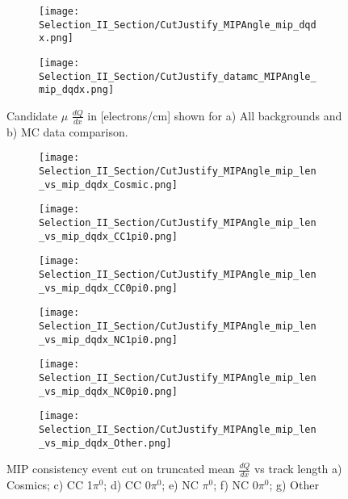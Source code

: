 \begin{figure}[H]
  \begin{subfigure}[t]{0.35\textwidth}
\texttt{[image: Selection\_II\_Section/CutJustify\_MIPAngle\_mip\_dqdx.png]}
    \caption{ }
  \end{subfigure} 
  \hspace{20mm}
  \begin{subfigure}[t]{0.35\textwidth}
\texttt{[image: Selection\_II\_Section/CutJustify\_datamc\_MIPAngle\_mip\_dqdx.png]}
    \caption{ }
  \end{subfigure} 
\caption{ Candidate $\mu$ $\frac{dQ}{dx}$ in [electrons/cm] shown for a) All backgrounds and b) MC data comparison. }
\label{fig:cutjust_sel2_multall_dqdx}
\end{figure}

\begin{figure}[H]
\centering
  \begin{subfigure}[t]{0.35\textwidth}
    \centering
\texttt{[image: Selection\_II\_Section/CutJustify\_MIPAngle\_mip\_len\_vs\_mip\_dqdx\_Cosmic.png]}
    \caption{ }
  \end{subfigure} 
  \hspace{10mm}
  \begin{subfigure}[t]{0.35\textwidth}
    \centering
\texttt{[image: Selection\_II\_Section/CutJustify\_MIPAngle\_mip\_len\_vs\_mip\_dqdx\_CC1pi0.png]}
    \caption{ }
  \end{subfigure} 
  \hspace{10mm}
  \begin{subfigure}[t]{0.35\textwidth}
    \centering
\texttt{[image: Selection\_II\_Section/CutJustify\_MIPAngle\_mip\_len\_vs\_mip\_dqdx\_CC0pi0.png]}
    \caption{ }
  \end{subfigure} 
    \hspace{10mm}
  \begin{subfigure}[t]{0.35\textwidth}
    \centering
\texttt{[image: Selection\_II\_Section/CutJustify\_MIPAngle\_mip\_len\_vs\_mip\_dqdx\_NC1pi0.png]}
    \caption{ }
  \end{subfigure} 
  \hspace{10mm}
  \begin{subfigure}[t]{0.35\textwidth}
    \centering
\texttt{[image: Selection\_II\_Section/CutJustify\_MIPAngle\_mip\_len\_vs\_mip\_dqdx\_NC0pi0.png]}
    \caption{ }
  \end{subfigure}
    \hspace{10mm}
  \begin{subfigure}[t]{0.35\textwidth}
    \centering
\texttt{[image: Selection\_II\_Section/CutJustify\_MIPAngle\_mip\_len\_vs\_mip\_dqdx\_Other.png]}
    \caption{ }
  \end{subfigure} 
\caption{ MIP consistency event cut on truncated mean $\frac{dQ}{dx}$ vs track length a) Cosmics; c) CC 1$\pi^0$; d) CC 0$\pi^0$; e) NC $\pi^0$; f) NC 0$\pi^0$; g) Other }
\label{fig:cutjust_mip_2d}
\end{figure}

